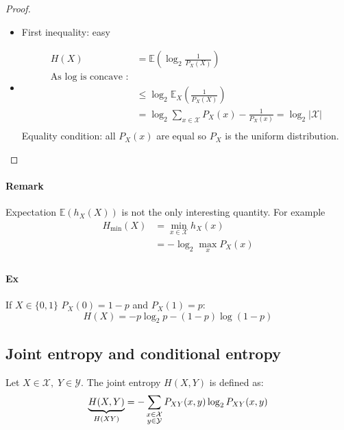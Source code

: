 \begin{proof}
\begin{itemize}
\item First inequality: easy
\item 
\begin{align*}
H(X) & =\mathbb{E}\left( \log_2 \frac{1}{P_X(X)}\right) \\
\text{As log is concave :}\\
& \leq \log_2 \mathbb{E}_X\left( \frac{1}{P_X(X)}\right)\\
& = \log_2 \sum_{x\in \mathcal{X}} P_X(x)-\frac{1}{P_X(x)}=\log_2 |\mathcal{X}|\\
\end{align*}
Equality condition: all $P_X(x)$ are equal so $P_X$ is the uniform distribution.
\end{itemize}
\end{proof}


\paragraph{Remark} Expectation $\mathbb{E}(h_X(X))$ is not the only interesting quantity. For example
\begin{align*}
H_{\min}(X) & = \min_{x\in \mathcal{X}} h_X(x)\\
& = - \log_2 \max_x P_X(x)\\
\end{align*}

\paragraph{Ex} If $X\in \{0,1\}$ $P_X(0)=1-p$ and $P_X(1)=p$:
\begin{equation*}
H(X)=-p\log_2 p - (1-p)\log(1-p)
\end{equation*}

\subsection{Joint entropy and conditional entropy}

\begin{defi}
Let $X\in \mathcal{X}, \; Y\in \mathcal{Y}$. The joint entropy $H(X,Y)$ is defined as:
\[
\underbrace{H(X,Y)}_{H(XY)} = - \sum_{\substack{x\in \mathcal{X} \\ y \in \mathcal{Y}}} P_{XY}(x,y) \log_2 P_{XY}(x,y)\\
\]
\end{defi}

